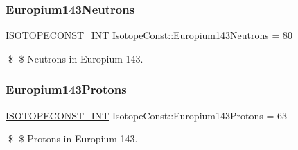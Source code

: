 \subsubsection{\texorpdfstring{Europium143\+Neutrons}{Europium143Neutrons}}
{\footnotesize\ttfamily \mbox{\hyperlink{group___isotope_const-_macros_ga5f18360b3e99483a35c32d789e62621c}{I\+S\+O\+T\+O\+P\+E\+C\+O\+N\+S\+T\+\_\+\+I\+NT}} Isotope\+Const\+::\+Europium143\+Neutrons = 80}

\$ \$ Neutrons in Europium-\/143. \mbox{\label{group___isotope_const-_europium-_eu143_ga29d63c4232770ab1f23b0a351e2871a3}} 
\subsubsection{\texorpdfstring{Europium143\+Protons}{Europium143Protons}}
{\footnotesize\ttfamily \mbox{\hyperlink{group___isotope_const-_macros_ga5f18360b3e99483a35c32d789e62621c}{I\+S\+O\+T\+O\+P\+E\+C\+O\+N\+S\+T\+\_\+\+I\+NT}} Isotope\+Const\+::\+Europium143\+Protons = 63}

\$ \$ Protons in Europium-\/143. 